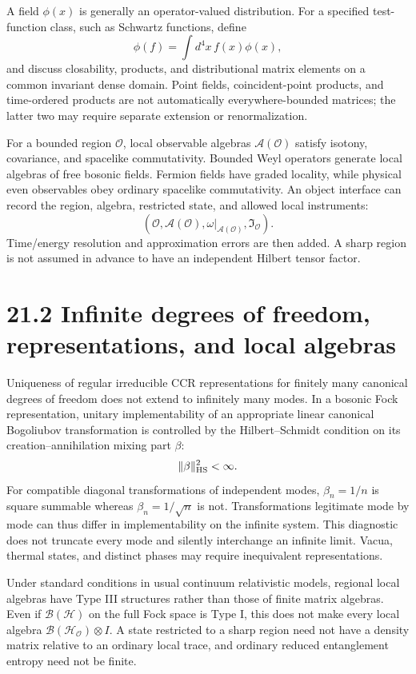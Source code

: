 \documentclass[
  11pt,
  oneside]{book}
\begin{document}
A field \(\phi(x)\) is generally an operator-valued distribution. For a
specified test-function class, such as Schwartz functions, define \[
\phi(f)=\int d^4x\,f(x)\phi(x),
\] and discuss closability, products, and distributional matrix elements
on a common invariant dense domain. Point fields, coincident-point
products, and time-ordered products are not automatically
everywhere-bounded matrices; the latter two may require separate
extension or renormalization.

For a bounded region \(\mathcal O\), local observable algebras
\(\mathcal A(\mathcal O)\) satisfy isotony, covariance, and spacelike
commutativity. Bounded Weyl operators generate local algebras of free
bosonic fields. Fermion fields have graded locality, while physical even
observables obey ordinary spacelike commutativity. An object interface
can record the region, algebra, restricted state, and allowed local
instruments: \[
(\mathcal O,\mathcal A(\mathcal O),\omega|_{\mathcal A(\mathcal O)},\mathfrak I_{\mathcal O}).
\] Time/energy resolution and approximation errors are then added. A
sharp region is not assumed in advance to have an independent Hilbert
tensor factor.

\section{21.2 Infinite degrees of freedom, representations, and local
algebras}

Uniqueness of regular irreducible CCR representations for finitely many
canonical degrees of freedom does not extend to infinitely many modes.
In a bosonic Fock representation, unitary implementability of an
appropriate linear canonical Bogoliubov transformation is controlled by
the Hilbert--Schmidt condition on its creation--annihilation mixing part
\(\beta\): \[
\|\beta\|_{\rm HS}^2<\infty.
\] For compatible diagonal transformations of independent modes,
\(\beta_n=1/n\) is square summable whereas \(\beta_n=1/\sqrt n\) is not.
Transformations legitimate mode by mode can thus differ in
implementability on the infinite system. This diagnostic does not
truncate every mode and silently interchange an infinite limit. Vacua,
thermal states, and distinct phases may require inequivalent
representations.

Under standard conditions in usual continuum relativistic models,
regional local algebras have Type III structures rather than those of
finite matrix algebras. Even if \(\mathcal B(\mathcal H)\) on the full
Fock space is Type I, this does not make every local algebra
\(\mathcal B(\mathcal H_{\mathcal O})\otimes I\). A state restricted to
a sharp region need not have a density matrix relative to an ordinary
local trace, and ordinary reduced entanglement entropy need not be
finite.
\end{document}
